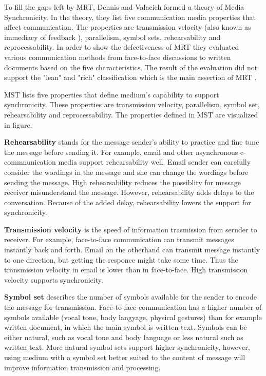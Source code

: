 \documentclass[english,12pt,a4paper,pdftex]{article}
\begin{document}
To fill the gaps left by \ac{MRT}, Dennis and Valacich formed a theory of Media Synchronicity. In the theory, they list five communication media properties that affect communication. The properties are transmission velocity (also known as immediacy of feedback \citep{dennis1999}), parallelism, symbol sets, rehearsability and reprocessability. In order to show the defectiveness of \ac{MRT} they evaluated various communication methods from face-to-face discussions to written documents based on the five characteristics. The result of the evaluation did not support the "lean" and "rich" classification which is the main assertion of \ac{MRT} \citep{dennis2008}.

\Ac{MST} lists five properties that define medium's capability to support synchronicity. These properties are transmission velocity, parallelism, symbol set, rehearsability and reprocessability. The properties defined in \ac{MST} are visualized in figure.

\textbf{Rehearsability} stands for the message sender's ability to practice and fine tune the message before sending it. For example, email and other asynchronous e-commnunication media support rehearsability well. Email sender can carefully consider the wordings in the message and she can change the wordings before sending the message. High rehearsability reduces the possiblity for message receiver misunderstand the message. However, rehearsability adds delays to the conversation. Because of the added delay, rehearsability lowers the support for synchronicity.

\textbf{Transmission velocity} is the speed of information trasmission from sernder to receiver. For example, face-to-face communication can transmit messages instantly back and forth. Email on the otherhand can transmit message instantly to one direction, but getting the responce might take some time. Thus the transmission velocity in email is lower than in face-to-face. High transmission velocity supports synchronicity.

\textbf{Symbol set} describes the number of symbols available for the sender to encode the message for transmission. Face-to-face communication has a higher number of symbols available (vocal tone, body langyage, physical gestures) than for example written document, in which the main symbol is written text. Symbols can be either natural, such as vocal tone and body language or less natural such as written text. More natural symbol sets support higher synchronicity, however, using medium with a symbol set better suited to the content of message will improve information transmission and processing.
\end{document}
